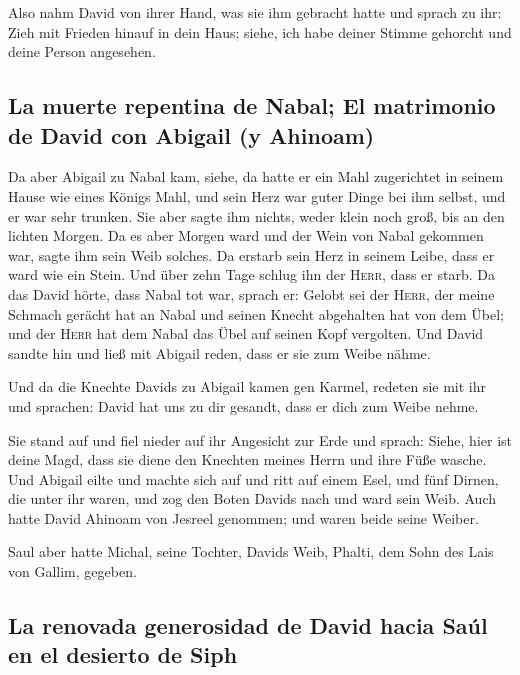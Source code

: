  Also nahm David von ihrer Hand, was sie ihm gebracht
hatte und sprach zu ihr: Zieh mit Frieden hinauf in dein Haus; siehe,
ich habe deiner Stimme gehorcht und deine Person angesehen.

\hypertarget{la-muerte-repentina-de-nabal-el-matrimonio-de-david-con-abigail-y-ahinoam}{%
\subsection{La muerte repentina de Nabal; El matrimonio de David con
Abigail (y
Ahinoam)}\label{la-muerte-repentina-de-nabal-el-matrimonio-de-david-con-abigail-y-ahinoam}}

 Da aber Abigail zu Nabal kam, siehe, da hatte er ein
Mahl zugerichtet in seinem Hause wie eines Königs Mahl, und sein Herz
war guter Dinge bei ihm selbst, und er war sehr trunken. Sie aber sagte
ihm nichts, weder klein noch groß, bis an den lichten Morgen.
 Da es aber Morgen ward und der Wein von Nabal gekommen
war, sagte ihm sein Weib solches. Da erstarb sein Herz in seinem Leibe,
dass er ward wie ein Stein.  Und über zehn Tage schlug
ihn der \textsc{Herr}, dass er starb.  Da das David
hörte, dass Nabal tot war, sprach er: Gelobt sei der \textsc{Herr}, der
meine Schmach gerächt hat an Nabal und seinen Knecht abgehalten hat von
dem Übel; und der \textsc{Herr} hat dem Nabal das Übel auf seinen Kopf
vergolten. Und David sandte hin und ließ mit Abigail reden, dass er sie
zum Weibe nähme.

 Und da die Knechte Davids zu Abigail kamen gen Karmel,
redeten sie mit ihr und sprachen: David hat uns zu dir gesandt, dass er
dich zum Weibe nehme.

 Sie stand auf und fiel nieder auf ihr Angesicht zur Erde
und sprach: Siehe, hier ist deine Magd, dass sie diene den Knechten
meines Herrn und ihre Füße wasche.  Und Abigail eilte und
machte sich auf und ritt auf einem Esel, und fünf Dirnen, die unter ihr
waren, und zog den Boten Davids nach und ward sein Weib. 
Auch hatte David Ahinoam von Jesreel genommen; und waren beide seine
Weiber.

 Saul aber hatte Michal, seine Tochter, Davids Weib,
Phalti, dem Sohn des Lais von Gallim, gegeben.

\hypertarget{la-renovada-generosidad-de-david-hacia-sauxfal-en-el-desierto-de-siph}{%
\subsection{La renovada generosidad de David hacia Saúl en el desierto
de
Siph}\label{la-renovada-generosidad-de-david-hacia-sauxfal-en-el-desierto-de-siph}}

